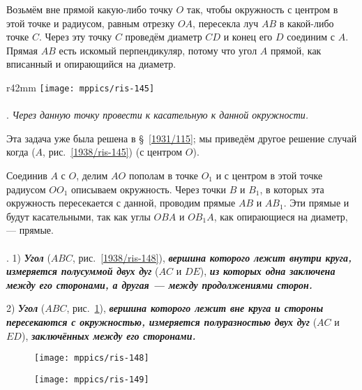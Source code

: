 Возьмём вне прямой какую-либо точку $O$ так, чтобы окружность с центром в этой точке и радиусом, равным отрезку $OA$, пересекла луч $AB$ в какой-либо точке $C$.
Через эту точку $C$ проведём диаметр $CD$ и конец его $D$ соединим с $A$.
Прямая $AB$ есть искомый перпендикуляр, потому что угол $A$ прямой, как вписанный и опирающийся на диаметр.


\begin{wrapfigure}{r}{42mm}
\centering
\texttt{[image: mppics/ris-145]}
\caption{}\label{1938/ris-145}
\end{wrapfigure}

\paragraph{}\label{1938/128}
\mbox{.}
\emph{Через данную точку провести к касательную к данной окружности.}

Эта задача уже  была решена в §~\ref{1931/115};
мы приведём другое решение случай когда  ($A$, рис.~\ref{1938/ris-145})  (с центром $O$).

Соединив $A$ с $O$, делим $AO$ пополам в точке $O_1$ и с центром в этой точке радиусом $OO_1$ описываем окружность.
Через точки $B$ и $B_1$, в которых эта окружность пересекается с данной, проводим прямые $AB$ и $AB_1$.
Эти прямые и будут касательными, так как углы $OBA$ и $OB_1A$, как опирающиеся на диаметр, — прямые.




\paragraph{}\label{1938/130}
.
1) \textbf{\emph{Угол}} ($ABC$, рис.~\ref{1938/ris-148}), \textbf{\emph{вершина которого лежит внутри круга, измеряется полусуммой двух дуг}} ($AC$ и $DE$), \textbf{\emph{из которых одна заключена между его сторонами, а другая — между продолжениями сторон.}}

2) \textbf{\emph{Угол}} ($ABC$, рис.~\ref{1938/ris-149}), \textbf{\emph{вершина которого лежит вне круга и стороны пересекаются с окружностью, измеряется полуразностью двух дуг}} ($AC$ и $ED$), \textbf{\emph{заключённых между его сторонами.}}

\begin{figure}[h]
\begin{minipage}{.48\textwidth}
\centering
\texttt{[image: mppics/ris-148]}
\end{minipage}
\hfill
\begin{minipage}{.48\textwidth}
\centering
\texttt{[image: mppics/ris-149]}
\end{minipage}

\medskip

\begin{minipage}{.48\textwidth}
\centering
\caption{}\label{1938/ris-148}
\end{minipage}
\hfill
\begin{minipage}{.48\textwidth}
\centering
\caption{}\label{1938/ris-149}
\end{minipage}
\vskip-4mm
\end{figure}

